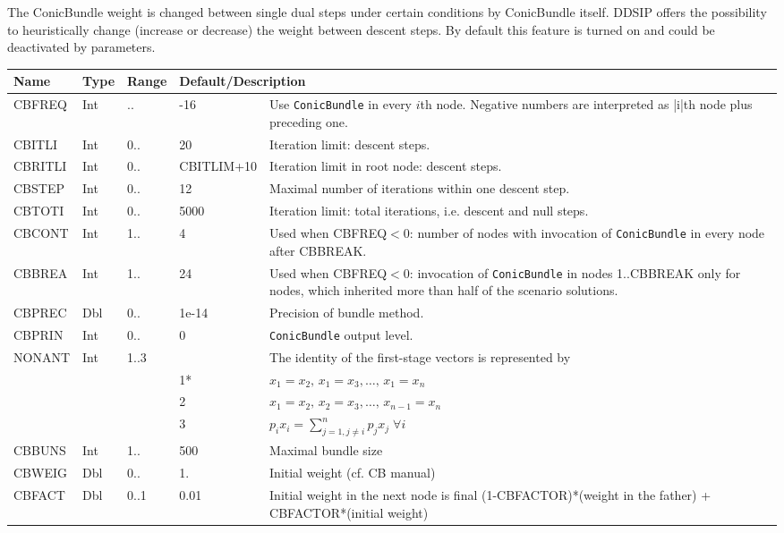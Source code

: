 \documentclass[11pt,draft]{article}
\newcommand{\+}{{\ti{+}}}
\newcommand{\1}{{\ti{1}}}
\begin{document}
The ConicBundle weight is changed between single dual steps under certain conditions by ConicBundle itself.
DDSIP offers the possibility to heuristically change (increase or decrease) the weight between descent steps.
By default this feature is turned on and could be deactivated by parameters.

\begin{center}
\begin{tabular}{|llllp{6.6cm}|} 
\hline
Name&Type&Range&\multicolumn{2}{l|}{Default/Description}\\ \hline
CBFREQ&Int&..&-16&Use \texttt{ConicBundle} in every $i$th node. Negative numbers are interpreted as |i|th node plus preceding one.\medskip\\
CBITLI&Int&0..&20&Iteration limit: descent steps.\medskip\\
CBRITLI&Int&0..&{\footnotesize CBITLIM+10}&Iteration limit in root node: descent steps.\medskip\\
CBSTEP&Int&0..&12&Maximal number of iterations within one descent step.\medskip\\
CBTOTI&Int&0..&5000&Iteration limit: total iterations, i.e. descent and null steps.\medskip\\
CBCONT &Int&1..&4&Used when CBFREQ$<$0: number of nodes with invocation of \texttt{ConicBundle} in every node after CBBREAK.\medskip\\
CBBREA &Int&1..&24&Used when CBFREQ$<$0: invocation of \texttt{ConicBundle} in nodes 1..CBBREAK only for nodes, which inherited more than half of the scenario solutions.\medskip\\
CBPREC&Dbl&0..&1e-14&Precision of bundle method.\medskip\\
CBPRIN&Int&0..&0&\texttt{ConicBundle} output level.\medskip\\
NONANT&Int&1..3&& The identity of the first-stage vectors is represented
by \\
&&&1*&$x_1 = x_2,\, x_1 = x_3,\ldots,\, x_1 = x_n$\\
&&&2& $x_1 = x_2,\, x_2 = x_3,\ldots,\, x_{n-1} = x_n$\\
&&&3& $p_ix_i = \sum_{j=1,j \ne i}^n p_jx_j \; \forall i$\medskip\\ 
CBBUNS &Int&1..&500&Maximal bundle size\medskip\\ 
CBWEIG &Dbl&0..&1.&Initial weight (cf. CB manual)\\
CBFACT &Dbl&0..1&0.01&Initial weight in the next node is final (1-CBFACTOR)*(weight in the father) + CBFACTOR*(initial weight)\\

\end{tabular}
\end{center}
\end{document}
